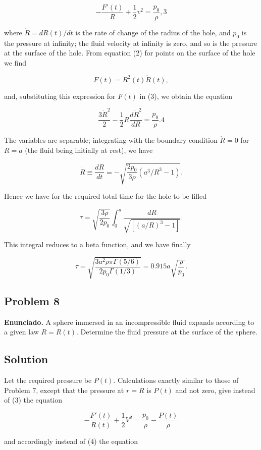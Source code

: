 \documentclass{article}
\begin{document}
$$
-\frac{F'(t)}{R} + \frac{1}{2} v^2 = \frac{p_0}{\rho}, {3}
$$

where $\dot{R} = dR(t)/dt$ is the rate of change of the radius of the hole, and $p_0$ is the pressure at infinity; the fluid velocity at infinity is zero, and so is the pressure at the surface of the hole. From equation (2) for points on the surface of the hole we find

$$
F(t) = R^2(t) \dot{R}(t),
$$

and, substituting this expression for $F(t)$ in (3), we obtain the equation

$$
\frac{3\dot{R}^2}{2} - \frac{1}{2} R \frac{d\dot{R}^2}{dR} = \frac{p_0}{\rho}. {4}
$$

The variables are separable; integrating with the boundary condition $\dot{R} = 0$ for $R = a$ (the fluid being initially at rest), we have

$$
\dot{R} \equiv \frac{dR}{dt} = -\sqrt{\frac{2p_0}{3\rho} \left( a^3/R^3 - 1 \right)}.
$$

Hence we have for the required total time for the hole to be filled

$$
\tau = \sqrt{\frac{3\rho}{2p_0}} \int_0^a \frac{dR}{\sqrt{[(a/R)^3 - 1]}}.
$$

This integral reduces to a beta function, and we have finally

$$
\tau = \sqrt{\frac{3a^2 \rho \pi \Gamma(5/6)}{2p_0 \Gamma(1/3)}} = 0.915a \sqrt{\frac{\rho}{p_0}}.
$$

\subsection*{Problem 8}

\textbf{Enunciado.} A sphere immersed in an incompressible fluid expands according to a given law $R = R(t)$. Determine the fluid pressure at the surface of the sphere.

\subsection*{Solution}

Let the required pressure be $P(t)$. Calculations exactly similar to those of Problem 7, except that the pressure at $r = R$ is $P(t)$ and not zero, give instead of (3) the equation

$$
-\frac{F'(t)}{R(t)} + \frac{1}{2} V^2 = \frac{p_0}{\rho} - \frac{P(t)}{\rho}
$$

and accordingly instead of (4) the equation
\end{document}
